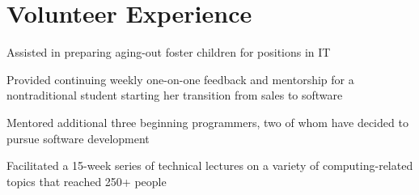 \documentclass[letterpaper]{deedy-resume} %
\begin{document}
\begin{minipage}[t]{0.66\textwidth}

\section{Volunteer Experience}

%
\begin{tightitemize}
\item Assisted in preparing aging-out foster children for positions in IT
\end{tightitemize}
%
\sectionspace %


%
\begin{tightitemize}
\item Provided continuing weekly one-on-one feedback and mentorship for a nontraditional student starting her transition from sales to software
\item Mentored additional three beginning programmers, two of whom have decided to pursue software development  
\end{tightitemize}
%
\sectionspace %



\begin{tightitemize}
\item Facilitated a 15-week series of technical lectures on a variety of computing-related topics that reached 250+ people
\end{tightitemize}


\end{minipage}
\end{document}
